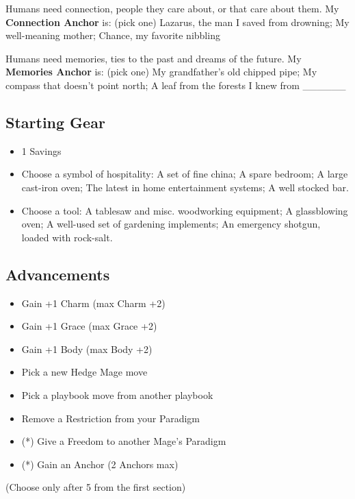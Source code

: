 \documentclass[
]{memoir}
\begin{document}
Humans need connection, people they care about, or that care about them.
My \textbf{Connection Anchor} is: (pick one) Lazarus, the man I saved
from drowning; My well-meaning mother; Chance, my favorite nibbling

Humans need memories, ties to the past and dreams of the future. My
\textbf{Memories Anchor} is: (pick one) My grandfather's old chipped
pipe; My compass that doesn't point north; A leaf from the forests I
knew from \_\_\_\_\_\_

\hypertarget{starting-gear-2}{%
\subsection{Starting Gear}\label{starting-gear-2}}

\begin{itemize}
\tightlist
\item
  1 Savings
\item
  Choose a symbol of hospitality: A set of fine china; A spare bedroom;
  A large cast-iron oven; The latest in home entertainment systems; A
  well stocked bar.
\item
  Choose a tool: A tablesaw and misc. woodworking equipment; A
  glassblowing oven; A well-used set of gardening implements; An
  emergency shotgun, loaded with rock-salt.
\end{itemize}

\hypertarget{advancements-2}{%
\subsection{Advancements}\label{advancements-2}}

\begin{itemize}
\tightlist
\item
  Gain +1 Charm (max Charm +2)
\item
  Gain +1 Grace (max Grace +2)
\item
  Gain +1 Body (max Body +2)
\item
  Pick a new Hedge Mage move
\item
  Pick a playbook move from another playbook
\item
  Remove a Restriction from your Paradigm
\item
  (*) Give a Freedom to another Mage's Paradigm
\item
  (*) Gain an Anchor (2 Anchors max)
\end{itemize}

(Choose only after 5 from the first section)
\end{document}
